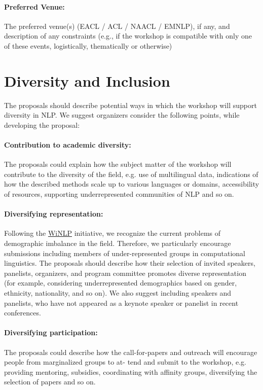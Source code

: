 \paragraph{Preferred Venue:} The preferred venue(s) (EACL / ACL / NAACL / EMNLP), if any, and description of any constraints (e.g., if the workshop is compatible with only one of these events, logistically, thematically or otherwise)

\section{Diversity and Inclusion}
The proposals should describe potential ways in which the workshop will support diversity in NLP. We suggest organizers consider the following points, while developing the proposal:

\paragraph{Contribution to academic diversity:} The proposals could explain how the subject matter of the workshop will contribute to the diversity of the field, e.g. use of multilingual data, indications of how the described methods scale up to various languages or domains, accessibility of resources, supporting underrepresented communities of NLP and so on.

\paragraph{Diversifying representation:} Following the \href{https://winlp.org}{WiNLP} initiative, we recognize the current problems of demographic imbalance in the field. Therefore, we particularly encourage submissions including members of under-represented groups in computational linguistics. The proposals should describe how their selection of invited speakers, panelists, organizers, and program committee promotes diverse representation (for example, considering underrepresented demographics based on gender, ethnicity, nationality, and so on). We also suggest including speakers and panelists, who have not appeared as a keynote speaker or panelist in recent conferences.

\paragraph{Diversifying participation:} The proposals could describe how the call-for-papers and outreach will encourage people from marginalized groups to at- tend and submit to the workshop, e.g. providing mentoring, subsidies, coordinating with affinity groups, diversifying the selection of papers and so on.

